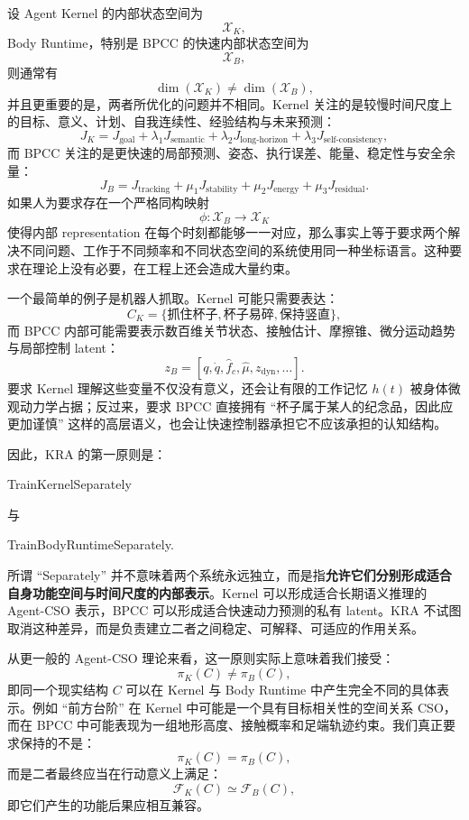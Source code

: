 设 Agent Kernel 的内部状态空间为
\[
\mathcal X_K,
\]
Body Runtime，特别是 BPCC 的快速内部状态空间为
\[
\mathcal X_B,
\]
则通常有
\[
\dim(\mathcal X_K)\neq \dim(\mathcal X_B),
\]
并且更重要的是，两者所优化的问题并不相同。Kernel 关注的是较慢时间尺度上的目标、意义、计划、自我连续性、经验结构与未来预测：
\[
J_K
=
J_{\text{goal}}
+
\lambda_1J_{\text{semantic}}
+
\lambda_2J_{\text{long-horizon}}
+
\lambda_3J_{\text{self-consistency}},
\]
而 BPCC 关注的是更快速的局部预测、姿态、执行误差、能量、稳定性与安全余量：
\[
J_B
=
J_{\text{tracking}}
+
\mu_1J_{\text{stability}}
+
\mu_2J_{\text{energy}}
+
\mu_3J_{\text{residual}}.
\]
如果人为要求存在一个严格同构映射
\[
\phi:\mathcal X_B\rightarrow \mathcal X_K
\]
使得内部 representation 在每个时刻都能够一一对应，那么事实上等于要求两个解决不同问题、工作于不同频率和不同状态空间的系统使用同一种坐标语言。这种要求在理论上没有必要，在工程上还会造成大量约束。

一个最简单的例子是机器人抓取。Kernel 可能只需要表达：
\[
C_K=
\{\text{抓住杯子},\text{杯子易碎},\text{保持竖直}\},
\]
而 BPCC 内部可能需要表示数百维关节状态、接触估计、摩擦锥、微分运动趋势与局部控制 latent：
\[
z_B
=
[q,\dot q,\hat f_c,\hat \mu,z_{\text{dyn}},\ldots].
\]
要求 Kernel 理解这些变量不仅没有意义，还会让有限的工作记忆 $h(t)$ 被身体微观动力学占据；反过来，要求 BPCC 直接拥有 ``杯子属于某人的纪念品，因此应更加谨慎'' 这样的高层语义，也会让快速控制器承担它不应该承担的认知结构。

因此，KRA 的第一原则是：
\begin{statementbox}
TrainKernelSeparately
\end{statementbox}
与
\begin{statementbox}
TrainBodyRuntimeSeparately.
\end{statementbox}

所谓 ``Separately'' 并不意味着两个系统永远独立，而是指\textbf{允许它们分别形成适合自身功能空间与时间尺度的内部表示}。Kernel 可以形成适合长期语义推理的 Agent-CSO 表示，BPCC 可以形成适合快速动力预测的私有 latent。KRA 不试图取消这种差异，而是负责建立二者之间稳定、可解释、可适应的作用关系。

从更一般的 Agent-CSO 理论来看，这一原则实际上意味着我们接受：
\[
\pi_K(C)\neq\pi_B(C),
\]
即同一个现实结构 $C$ 可以在 Kernel 与 Body Runtime 中产生完全不同的具体表示。例如 ``前方台阶'' 在 Kernel 中可能是一个具有目标相关性的空间关系 CSO，而在 BPCC 中可能表现为一组地形高度、接触概率和足端轨迹约束。我们真正要求保持的不是：
\[
\pi_K(C)=\pi_B(C),
\]
而是二者最终应当在行动意义上满足：
\[
\mathcal F_K(C)
\simeq
\mathcal F_B(C),
\]
即它们产生的功能后果应相互兼容。

